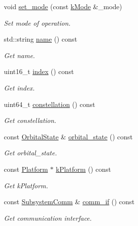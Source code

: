 \begin{DoxyCompactItemize}
void \hyperlink{classosse_1_1collaborate_1_1_node_a3d477f1fa6f8866f4b35618efb5802d2}{set\+\_\+mode} (const \hyperlink{classosse_1_1collaborate_1_1_node_a6f8b0270e42a0c2059d7b554acfbd3db}{k\+Mode} \&\+\_\+mode)
\begin{DoxyCompactList}\small\item\em Set mode of operation. \end{DoxyCompactList}\item 
std\+::string \hyperlink{classosse_1_1collaborate_1_1_node_a4967cafbc71c566ec34a9ae05849cfbe}{name} () const
\begin{DoxyCompactList}\small\item\em Get name. \end{DoxyCompactList}\item 
uint16\+\_\+t \hyperlink{classosse_1_1collaborate_1_1_node_a07b4c8d3cdb8859e50a604a584c04a55}{index} () const
\begin{DoxyCompactList}\small\item\em Get index. \end{DoxyCompactList}\item 
uint64\+\_\+t \hyperlink{classosse_1_1collaborate_1_1_node_a43bddbe894e3c5bdd20cf0be0d0bd173}{constellation} () const
\begin{DoxyCompactList}\small\item\em Get constellation. \end{DoxyCompactList}\item 
const \hyperlink{classosse_1_1collaborate_1_1_orbital_state}{Orbital\+State} \& \hyperlink{classosse_1_1collaborate_1_1_node_a42ec8f451ee77becdb4d3cf5992c11c9}{orbital\+\_\+state} () const
\begin{DoxyCompactList}\small\item\em Get orbital\+\_\+state. \end{DoxyCompactList}\item 
const \hyperlink{classosse_1_1collaborate_1_1_platform}{Platform} $\ast$ \hyperlink{classosse_1_1collaborate_1_1_node_a9601f81216155623ab7fe14d26f78f88}{k\+Platform} () const
\begin{DoxyCompactList}\small\item\em Get k\+Platform. \end{DoxyCompactList}\item 
const \hyperlink{classosse_1_1collaborate_1_1_subsystem_comm}{Subsystem\+Comm} \& \hyperlink{classosse_1_1collaborate_1_1_node_a23bfe1a7c15e88e46111485264912a9c}{comm\+\_\+if} () const
\begin{DoxyCompactList}\small\item\em Get communication interface. \end{DoxyCompactList}\item 

\end{DoxyCompactItemize}
